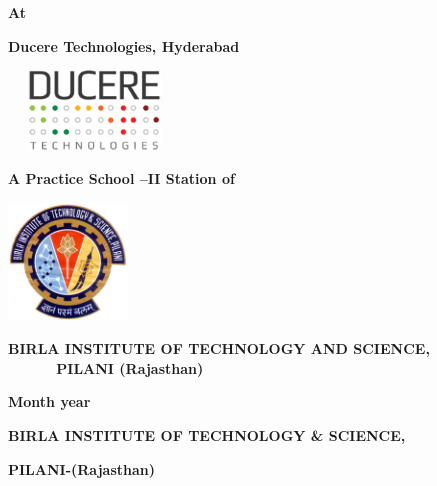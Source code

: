 \documentclass[11pt]{report}
\begin{document}
\bigskip

{\centering{}\bfseries
At
\par}


\bigskip

{\centering{}\bfseries
Ducere Technologies, Hyderabad
\par}

{\centering 
\includegraphics[width=4.575cm,height=2.124cm]{logo.png}
\par}


\bigskip


\bigskip

{\centering{}\bfseries
A Practice School --II Station of
\par}


\bigskip

{\centering 
\includegraphics[width=3.175cm,height=3.124cm]{formatreport-img2.jpg}
\par}


\bigskip


\bigskip

{\centering{}\bfseries
BIRLA INSTITUTE OF TECHNOLOGY AND SCIENCE, \ \ \ \ \ \ PILANI
(Rajasthan)
\par}

{\centering{}\bfseries
Month year
\par}


\bigskip


\bigskip


\bigskip


\bigskip

{\centering{}\bfseries
BIRLA INSTITUTE OF TECHNOLOGY \& SCIENCE,
\par}

{\centering{}\bfseries
PILANI-(Rajasthan)
\par}
\end{document}
